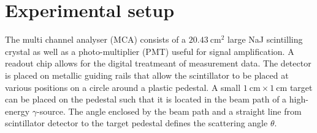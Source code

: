 
\section{Experimental setup}
\label{sec:setup}

The multi channel analyser (MCA) consists of a $\SI{20.43}{\centi\meter\squared}$
large NaJ scintilling crystal as well as a photo-multiplier (PMT) useful for
signal amplification. A readout chip allows for the digital treatmeant of measurement
data. The detector is placed on metallic guiding rails that allow the scintillator
to be placed at various positions on a circle around a plastic pedestal. A small
$\SI{1}{\centi\meter}\times\SI{1}{\centi\meter}$ target can be placed on the
pedestal such that it is located in the beam path of a high-energy $\gamma$-source.
The angle enclosed by the beam path and a straight line from scintillator detector
to the target pedestal defines the scattering angle $\theta$.
